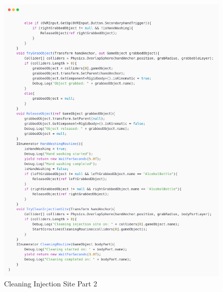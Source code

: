\begin{figure}[h] 
	\centering
	\includegraphics[width=1\textwidth, height=0.7\textheight]{Images/cleaning2.png}
	\caption{Cleaning Injection Site Part 2}
	\label{fig:Hands Washing}
\end{figure}

